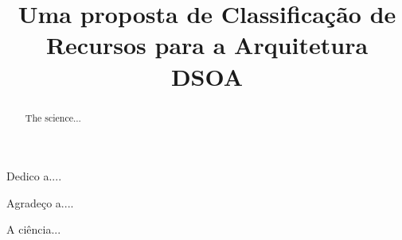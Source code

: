 \documentclass[bacharelado]{unb-cic}
\title{Uma proposta de Classificação de Recursos para a Arquitetura DSOA}
\begin{document}
  \lstset{language=Java}
  \maketitle
  \pretextual

  \begin{dedicatoria}
  Dedico a....
  \end{dedicatoria}

  \begin{agradecimentos}
  Agradeço a....
  \end{agradecimentos}

  \begin{resumo}
  A ciência...
  \end{resumo}

  \begin{abstract}
  The science...
  \end{abstract}

  \tableofcontents
  \listoffigures
  \listoftables

  \textual
  
  
  
  
  

  \postextual
  
  
\end{document}
